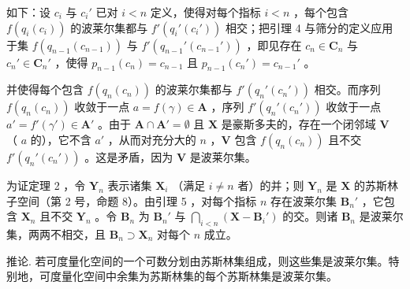 如下：设 \(c_i\) 与 \(c_i'\) 已对 \(i < n\) 定义，使得对每个指标 \(i < n\) ，每个包含 \(f(q_i(c_i))\) 的波莱尔集都与 \(f'(q_i'(c_i'))\) 相交；把引理 4 与筛分的定义应用于集 \(f(q_{n-1}(c_{n-1}))\) 与 \(f'(q_{n-1}'(c_{n-1}'))\) ，即见存在 \(c_n \in \mathbf{C}_n\) 与 \(c_n' \in \mathbf{C}_n'\) ，使得 \(p_{n-1}(c_n) = c_{n-1}\) 且 \(p_{n-1}(c_n') = c_{n-1}'\) 。

并使得每个包含 \(f(q_n(c_n))\) 的波莱尔集都与 \(f'(q_n'(c_n'))\) 相交。而序列 \(f(q_n(c_n))\) 收敛于一点 \(a = f(\gamma) \in \mathbf{A}\) ，序列 \(f'(q_n'(c_n'))\) 收敛于一点 \(a' = f'(\gamma') \in \mathbf{A}'\) 。由于 \(\mathbf{A} \cap \mathbf{A}' = \emptyset\) 且 \(\mathbf{X}\) 是豪斯多夫的，存在一个闭邻域 \(\mathbf{V}\) （ \(a\) 的），它不含 \(a'\) ，从而对充分大的 \(n\) ，\(\mathbf{V}\) 包含 \(f(q_n(c_n))\) 且不交 \(f'(q_n'(c_n'))\) 。这是矛盾，因为 \(\mathbf{V}\) 是波莱尔集。

为证定理 2 ，令 \(\mathbf{Y}_n\) 表示诸集 \(\mathbf{X}_i\) （满足 \(i \neq n\) 者）的并；则 \(\mathbf{Y}_n\) 是 \(\mathbf{X}\) 的苏斯林子空间（第 2 号，命题 8）。由引理 5 ，对每个指标 \(n\) 存在波莱尔集 \(\mathbf{B}_n'\) ，它包含 \(\mathbf{X}_n\) 且不交 \(\mathbf{Y}_n\) 。令 \(\mathbf{B}_n\) 为 \(\mathbf{B}_n'\) 与 \(\bigcap_{i < n} (\mathbf{X} - \mathbf{B}_i')\) 的交。则诸 \(\mathbf{B}_n\) 是波莱尔集，两两不相交，且 \(\mathbf{B}_n \supset \mathbf{X}_n\) 对每个 \(n\) 成立。

推论. 若可度量化空间的一个可数分划由苏斯林集组成，则这些集是波莱尔集。特别地，可度量化空间中余集为苏斯林集的每个苏斯林集是波莱尔集。

